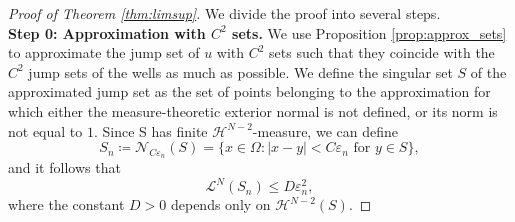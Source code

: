 \documentclass[a4paper, 11pt, reqno]{amsart}
\theoremstyle{plain}
\theoremstyle{definition}
\theoremstyle{remark}
\begin{document}
\begin{proof}[Proof of Theorem \ref{thm:limsup}]
We divide the proof into several steps.\\[0.5em]
\textbf{Step 0: Approximation with $C^2$ sets.} 
We use Proposition \ref{prop:approx_sets} to approximate the jump set of $u$ with $C^2$ sets such that they coincide with the $C^2$ jump sets of the wells as much as possible. 
We define the singular set $S$ of the approximated jump set as the set of points belonging to the approximation for which either the measure-theoretic exterior normal is not defined, or its norm is not equal to $1$. Since S has finite $\mathcal{H}^{N-2}$-measure, we can define 
$$ S_n \coloneqq \mathcal{N}_{C\varepsilon_n} (S) = \{ x \in \Omega : | x - y | < C \varepsilon_n \text{ for } y \in S \}, $$
and it follows that
$$ \mathcal{L}^N (S_n) \leq D \varepsilon_n^2, $$
where the constant $D > 0$ depends only on $\mathcal{H}^{N-2} (S)$.


\end{proof}
\end{document}
